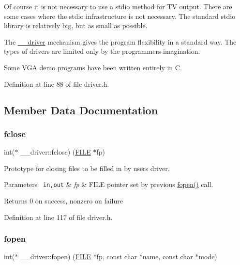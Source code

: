 Of course it is not necessary to use a stdio method for TV output. There are some cases where the stdio infrastructure is not necessary. The standard stdio library is relatively big, but as small as possible.

The \mbox{\hyperlink{struct____driver}{\+\_\+\+\_\+driver}} mechanism gives the program flexibility in a standard way. The types of drivers are limited only by the programmer\textquotesingle{}s imagination.

Some V\+GA demo programs have been written entirely in C. 

Definition at line 88 of file driver.\+h.



\subsection{Member Data Documentation}
\mbox{\label{struct____driver_a31af02555db35d9f4f4f8c63614fee62}} 
\subsubsection{\texorpdfstring{fclose}{fclose}}
{\footnotesize\ttfamily int($\ast$ \+\_\+\+\_\+driver\+::fclose) (\mbox{\hyperlink{stdio_8h_a175abb747ea3b78aa8da87355dcec473}{F\+I\+LE}} $\ast$fp)}

Prototype for closing files to be filled in by user\textquotesingle{}s driver. 
\begin{DoxyParams}[1]{Parameters}
\mbox{\texttt{ in,out}}  & {\em fp} & F\+I\+LE pointer set by previous \mbox{\hyperlink{struct____driver_aff96f49764bd6d991e204f1e3cd0adfd}{fopen()}} call. \\
\hline
\end{DoxyParams}
\begin{DoxyReturn}{Returns}
0 on success, nonzero on failure 
\end{DoxyReturn}


Definition at line 117 of file driver.\+h.

\mbox{\label{struct____driver_aff96f49764bd6d991e204f1e3cd0adfd}} 
\subsubsection{\texorpdfstring{fopen}{fopen}}
{\footnotesize\ttfamily int($\ast$ \+\_\+\+\_\+driver\+::fopen) (\mbox{\hyperlink{stdio_8h_a175abb747ea3b78aa8da87355dcec473}{F\+I\+LE}} $\ast$fp, const char $\ast$name, const char $\ast$mode)}

